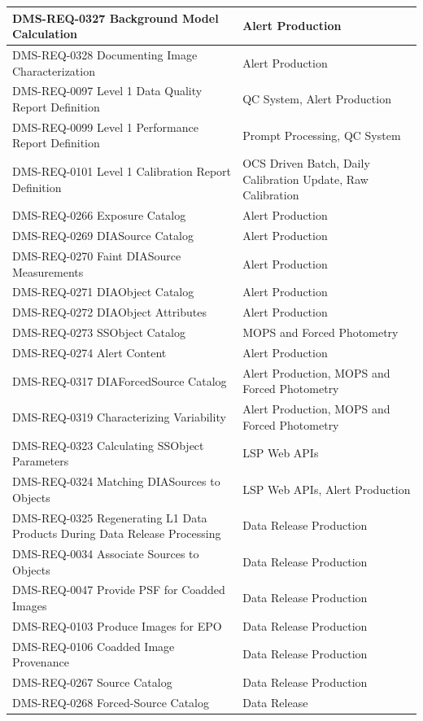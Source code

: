 \documentclass[DM,lsstdraft,toc]{lsstdoc}
\begin{document}
\begin{xtabular}{|p{0.4\textwidth}|p{0.55\textwidth}|}
DMS-REQ-0327 Background Model Calculation & Alert
Production\\ \hline
DMS-REQ-0328 Documenting Image Characterization & Alert
Production\\ \hline
DMS-REQ-0097 Level 1 Data Quality Report Definition & QC System, Alert
Production\\ \hline
DMS-REQ-0099 Level 1 Performance Report Definition & Prompt Processing,
QC System\\ \hline
DMS-REQ-0101 Level 1 Calibration Report Definition & OCS Driven Batch,
Daily Calibration Update, Raw Calibration\\ \hline
DMS-REQ-0266 Exposure Catalog & Alert Production\\ \hline
DMS-REQ-0269 DIASource Catalog & Alert Production\\ \hline
DMS-REQ-0270 Faint DIASource Measurements & Alert
Production\\ \hline
DMS-REQ-0271 DIAObject Catalog & Alert Production\\ \hline
DMS-REQ-0272 DIAObject Attributes & Alert Production\\ \hline
DMS-REQ-0273 SSObject Catalog & MOPS and Forced
Photometry\\ \hline
DMS-REQ-0274 Alert Content & Alert Production\\ \hline
DMS-REQ-0317 DIAForcedSource Catalog & Alert Production, MOPS and Forced
Photometry\\ \hline
DMS-REQ-0319 Characterizing Variability & Alert Production, MOPS and
Forced Photometry\\ \hline
DMS-REQ-0323 Calculating SSObject Parameters & LSP Web APIs\\ \hline
DMS-REQ-0324 Matching DIASources to Objects & LSP Web APIs, Alert
Production\\ \hline
DMS-REQ-0325 Regenerating L1 Data Products During Data Release
Processing & Data Release Production\\ \hline
DMS-REQ-0034 Associate Sources to Objects & Data Release
Production\\ \hline
DMS-REQ-0047 Provide PSF for Coadded Images & Data Release
Production\\ \hline
DMS-REQ-0103 Produce Images for EPO & Data Release
Production\\ \hline
DMS-REQ-0106 Coadded Image Provenance & Data Release
Production\\ \hline
DMS-REQ-0267 Source Catalog & Data Release Production\\ \hline
DMS-REQ-0268 Forced-Source Catalog & Data Release

\end{xtabular}
\end{document}
